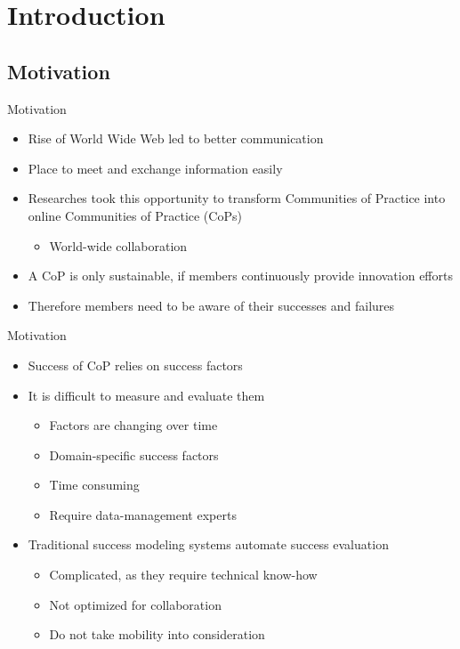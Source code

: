 \section{Introduction}

\subsection{Motivation}


\begin{frame}{Motivation}
  \begin{itemize}
    \item Rise of World Wide Web led to better communication
    \item Place to meet and exchange information easily
    \item Researches took this opportunity to transform Communities of Practice into online Communities of Practice (CoPs)
          \begin{itemize}
            \item World-wide collaboration
          \end{itemize}
    \item A CoP is only sustainable, if members continuously provide innovation efforts \cite{RKJa15}
    \item Therefore members need to be aware of their successes and failures
  \end{itemize}

\end{frame}

\begin{frame}{Motivation}
  \begin{itemize}
    \item Success of CoP relies on success factors
    \item It is difficult to measure and evaluate them
          \begin{itemize}
            \item Factors are changing over time \cite{Renz08}
            \item Domain-specific success factors
            \item Time consuming
            \item Require data-management experts %
          \end{itemize}
    \item Traditional success modeling systems automate success evaluation
          \begin{itemize}
            \item Complicated, as they require technical know-how
            \item Not optimized for collaboration
            \item Do not take mobility into consideration \cite{Renz08}
          \end{itemize}
  \end{itemize}
\end{frame}

